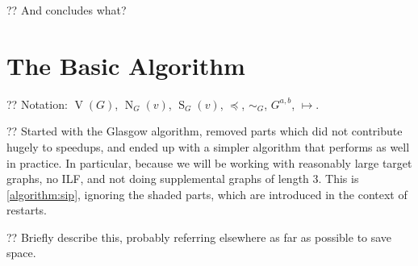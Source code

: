 \documentclass{article}
\newcommand{\neighbourhood}{\operatorname{N}}
\newcommand{\vertexset}{\operatorname{V}}
\newcommand{\nds}{\operatorname{S}}
\begin{document}
?? And concludes what? 

\section{The Basic Algorithm}

?? Notation: $\vertexset(G)$, $\neighbourhood_G(v)$, $\nds_G(v)$, $\preceq$, $\sim_G$, $G^{a,b}$, $\mapsto$.

?? Started with the Glasgow algorithm, removed parts which did not contribute hugely to speedups,
and ended up with a simpler algorithm that performs as well in practice. In particular, because we
will be working with reasonably large target graphs, no ILF, and not doing supplemental graphs of
length 3. This is \cref{algorithm:sip}, ignoring the shaded parts, which are introduced in the
context of restarts.

?? Briefly describe this, probably referring elsewhere as far as possible to save space.
\end{document}
